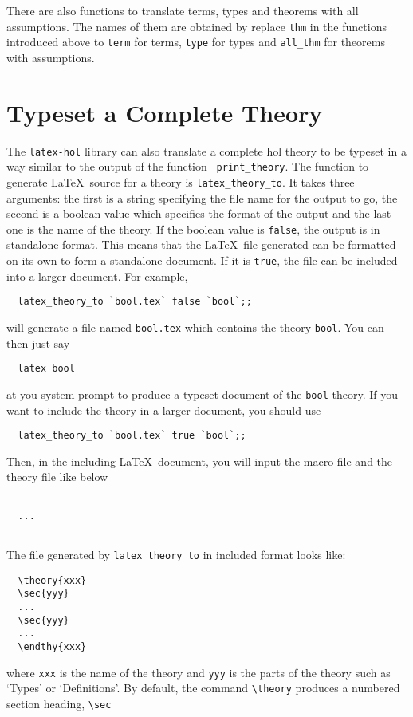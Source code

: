 There are also functions to translate terms, types and theorems with
all assumptions. The names of them are obtained by replace {\tt thm}
in the functions introduced above to {\tt term} for terms, {\tt type} for types
and {\tt all\_thm} for theorems with assumptions. 

\section{Typeset a Complete Theory}

The {\tt latex-hol} library can also translate a complete hol theory
to be typeset in a way similar to the output of the function {\tt
print\_theory}. The function to generate \LaTeX\ source for a theory
is {\tt latex\_theory\_to}. It takes three arguments: the first is a
string specifying the file name for the output to go, the second is a
boolean value which specifies the format of the output and the last one is
the name of the theory. If the boolean value is {\tt false}, the
output is in standalone format. This means that the \LaTeX\ file
generated can be formatted on its own to form a standalone document.
If it is {\tt true}, the file can be included into a larger document.
For example, 
\begin{verbatim}
  latex_theory_to `bool.tex` false `bool`;;
\end{verbatim}
will generate a file named {\tt bool.tex} which contains the theory
{\tt bool}. You can then just say 
\begin{verbatim}
  latex bool
\end{verbatim}
at you system prompt to produce a typeset document of the {\tt bool} theory.
If you want to include the theory in a larger document, you should use
\begin{verbatim}
  latex_theory_to `bool.tex` true `bool`;;
\end{verbatim}
Then, in the including \LaTeX\ document, you will input the macro file
and the theory file like below
\begin{verbatim}
  
  ...
  
\end{verbatim}
The file generated by {\tt latex\_theory\_to} in included format looks like:
\begin{verbatim}
  \theory{xxx}
  \sec{yyy}
  ...
  \sec{yyy}
  ...
  \endthy{xxx}
\end{verbatim}
where {\tt xxx} is the name of the theory and {\tt yyy} is the parts
of the theory such as `Types' or `Definitions'. By default, the command
\verb|\theory| produces a numbered section heading, \verb|\sec|

